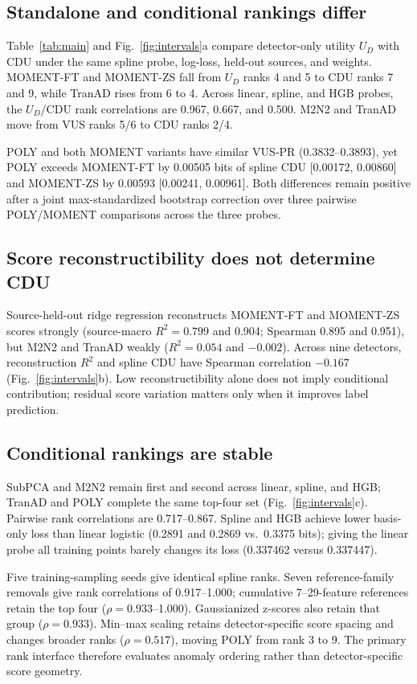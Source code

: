 \subsection{Standalone and conditional rankings differ}
Table~\ref{tab:main} and Fig.~\ref{fig:intervals}a compare detector-only utility $U_D$ with CDU under the same spline probe, log-loss, held-out sources, and weights. MOMENT-FT and MOMENT-ZS fall from $U_D$ ranks 4 and 5 to CDU ranks 7 and 9, while TranAD rises from 6 to 4. Across linear, spline, and HGB probes, the $U_D$/CDU rank correlations are 0.967, 0.667, and 0.500. M2N2 and TranAD move from VUS ranks 5/6 to CDU ranks 2/4.

\newpage
POLY and both MOMENT variants have similar VUS-PR (0.3832--0.3893), yet POLY exceeds MOMENT-FT by 0.00505 bits of spline CDU [0.00172, 0.00860] and MOMENT-ZS by 0.00593 [0.00241, 0.00961]. Both differences remain positive after a joint max-standardized bootstrap correction over three pairwise POLY/MOMENT comparisons across the three probes.

\subsection{Score reconstructibility does not determine CDU}
Source-held-out ridge regression reconstructs MOMENT-FT and MOMENT-ZS scores strongly (source-macro $R^2=0.799$ and 0.904; Spearman 0.895 and 0.951), but M2N2 and TranAD weakly ($R^2=0.054$ and $-0.002$). Across nine detectors, reconstruction $R^2$ and spline CDU have Spearman correlation $-0.167$ (Fig.~\ref{fig:intervals}b). Low reconstructibility alone does not imply conditional contribution; residual score variation matters only when it improves label prediction.

\subsection{Conditional rankings are stable}
SubPCA and M2N2 remain first and second across linear, spline, and HGB; TranAD and POLY complete the same top-four set (Fig.~\ref{fig:intervals}c). Pairwise rank correlations are 0.717--0.867. Spline and HGB achieve lower basis-only loss than linear logistic (0.2891 and 0.2869 vs.\ 0.3375 bits); giving the linear probe all training points barely changes its loss (0.337462 versus 0.337447).

Five training-sampling seeds give identical spline ranks. Seven reference-family removals give rank correlations of 0.917--1.000; cumulative 7--29-feature references retain the top four ($\rho=0.933$--1.000). Gaussianized z-scores also retain that group ($\rho=0.933$). Min--max scaling retains detector-specific score spacing and changes broader ranks ($\rho=0.517$), moving POLY from rank 3 to 9. The primary rank interface therefore evaluates anomaly ordering rather than detector-specific score geometry.

